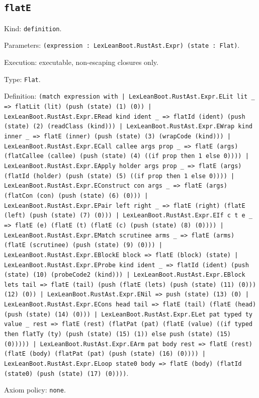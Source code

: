 \documentclass[11pt]{article}
\begin{document}
\subsection*{\texttt{flatE}}
\noindent Kind: \texttt{definition}.\par
\noindent Parameters: \texttt{(expression : LexLeanBoot.RustAst.Expr) (state : Flat)}.\par
\noindent Execution: executable, non-escaping closures only.\par
\noindent Type: \texttt{Flat}.\par
\noindent Definition: \texttt{(match expression with | LexLeanBoot.RustAst.Expr.ELit lit \_ => flatLit (lit) (push (state) (1) (0)) | LexLeanBoot.RustAst.Expr.ERead kind ident \_ => flatId (ident) (push (state) (2) (readClass (kind))) | LexLeanBoot.RustAst.Expr.EWrap kind inner \_ => flatE (inner) (push (state) (3) (wrapCode (kind))) | LexLeanBoot.RustAst.Expr.ECall callee args prop \_ => flatE (args) (flatCallee (callee) (push (state) (4) ((if prop then 1 else 0)))) | LexLeanBoot.RustAst.Expr.EApply holder args prop \_ => flatE (args) (flatId (holder) (push (state) (5) ((if prop then 1 else 0)))) | LexLeanBoot.RustAst.Expr.EConstruct con args \_ => flatE (args) (flatCon (con) (push (state) (6) (0))) | LexLeanBoot.RustAst.Expr.EPair left right \_ => flatE (right) (flatE (left) (push (state) (7) (0))) | LexLeanBoot.RustAst.Expr.EIf c t e \_ => flatE (e) (flatE (t) (flatE (c) (push (state) (8) (0)))) | LexLeanBoot.RustAst.Expr.EMatch scrutinee arms \_ => flatE (arms) (flatE (scrutinee) (push (state) (9) (0))) | LexLeanBoot.RustAst.Expr.EBlockE block => flatE (block) (state) | LexLeanBoot.RustAst.Expr.EProbe kind ident \_ => flatId (ident) (push (state) (10) (probeCode2 (kind))) | LexLeanBoot.RustAst.Expr.EBlock lets tail => flatE (tail) (push (flatE (lets) (push (state) (11) (0))) (12) (0)) | LexLeanBoot.RustAst.Expr.ENil => push (state) (13) (0) | LexLeanBoot.RustAst.Expr.ECons head tail => flatE (tail) (flatE (head) (push (state) (14) (0))) | LexLeanBoot.RustAst.Expr.ELet pat typed ty value \_ rest => flatE (rest) (flatPat (pat) (flatE (value) ((if typed then flatTy (ty) (push (state) (15) (1)) else push (state) (15) (0))))) | LexLeanBoot.RustAst.Expr.EArm pat body rest => flatE (rest) (flatE (body) (flatPat (pat) (push (state) (16) (0)))) | LexLeanBoot.RustAst.Expr.ELoop state0 body => flatE (body) (flatId (state0) (push (state) (17) (0))))}.\par
\noindent Axiom policy: \texttt{none}.\par
\end{document}
